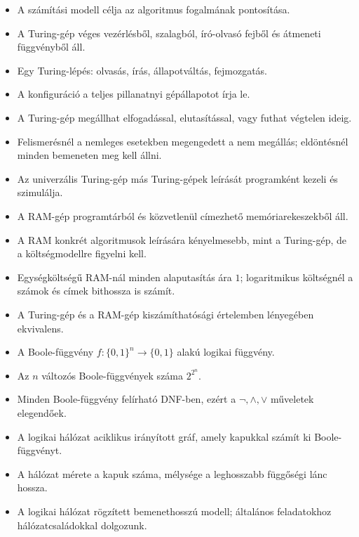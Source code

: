 \begin{itemize}
  \item A számítási modell célja az algoritmus fogalmának pontosítása.
  \item A Turing-gép véges vezérlésből, szalagból, író-olvasó fejből és átmeneti függvényből áll.
  \item Egy Turing-lépés: olvasás, írás, állapotváltás, fejmozgatás.
  \item A konfiguráció a teljes pillanatnyi gépállapotot írja le.
  \item A Turing-gép megállhat elfogadással, elutasítással, vagy futhat végtelen ideig.
  \item Felismerésnél a nemleges esetekben megengedett a nem megállás; eldöntésnél minden bemeneten meg kell állni.
  \item Az univerzális Turing-gép más Turing-gépek leírását programként kezeli és szimulálja.
  \item A RAM-gép programtárból és közvetlenül címezhető memóriarekeszekből áll.
  \item A RAM konkrét algoritmusok leírására kényelmesebb, mint a Turing-gép, de a költségmodellre figyelni kell.
  \item Egységköltségű RAM-nál minden alaputasítás ára $1$; logaritmikus költségnél a számok és címek bithossza is számít.
  \item A Turing-gép és a RAM-gép kiszámíthatósági értelemben lényegében ekvivalens.
  \item A Boole-függvény $f:\{0,1\}^n\to\{0,1\}$ alakú logikai függvény.
  \item Az $n$ változós Boole-függvények száma $2^{2^n}$.
  \item Minden Boole-függvény felírható DNF-ben, ezért a $\neg,\wedge,\vee$ műveletek elegendőek.
  \item A logikai hálózat aciklikus irányított gráf, amely kapukkal számít ki Boole-függvényt.
  \item A hálózat mérete a kapuk száma, mélysége a leghosszabb függőségi lánc hossza.
  \item A logikai hálózat rögzített bemenethosszú modell; általános feladatokhoz hálózatcsaládokkal dolgozunk.
\end{itemize}
